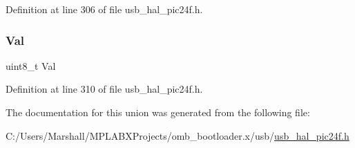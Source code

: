 Definition at line 306 of file usb\+\_\+hal\+\_\+pic24f.\+h.

\mbox{\label{union_____u_s_t_a_t_aa0c179f4462bb12ca1ed40d18c89cda1}} 
\subsubsection{\texorpdfstring{Val}{Val}}
{\footnotesize\ttfamily uint8\+\_\+t Val}



Definition at line 310 of file usb\+\_\+hal\+\_\+pic24f.\+h.



The documentation for this union was generated from the following file\+:\begin{DoxyCompactItemize}
\item 
C\+:/\+Users/\+Marshall/\+M\+P\+L\+A\+B\+X\+Projects/omb\+\_\+bootloader.\+x/usb/\mbox{\hyperlink{usb__hal__pic24f_8h}{usb\+\_\+hal\+\_\+pic24f.\+h}}\end{DoxyCompactItemize}
